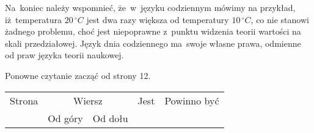 \documentclass[a4paper,11pt]{article}
\begin{document}
Na~koniec należy wspomnieć, że~w~języku codziennym mówimy na przykład,
iż~temperatura $20 \, {}^{ \circ }\si{C}$ jest dwa razy większa od temperatury
$10 \, {}^{ \circ }\si{C}$, co nie stanowi żadnego problemu, choć jest
niepoprawne z~punktu widzenia teorii wartości na skali przedziałowej. Język
dnia codziennego ma~swoje własne prawa, odmienne od praw języka teorii
naukowej.

{\Large Ponowne czytanie zacząć od strony 12.}

























\newpage



\begin{center}

  \begin{tabular}{|c|c|c|c|c|}
    \hline
    Strona & \multicolumn{2}{c|}{Wiersz} & Jest
                              & Powinno być \\ \cline{2-3}
    & Od góry & Od dołu & & \\
    \hline
    \hline
  \end{tabular}

\end{center}

\vspace{\VerSpaceSix}

















{}






\end{document}
